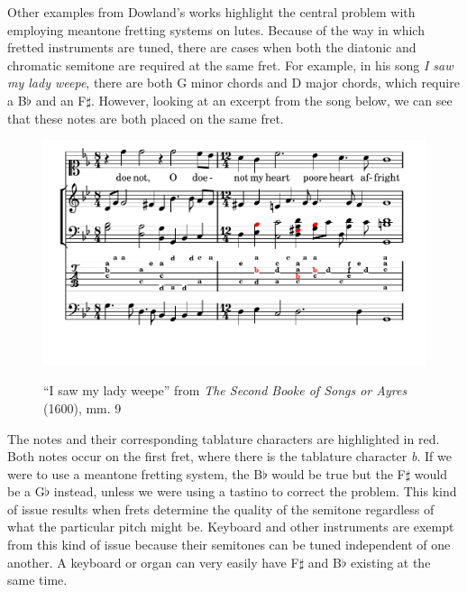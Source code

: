 Other examples from Dowland's works highlight the central problem with employing meantone fretting
systems on lutes.  Because of the way in which fretted instruments are tuned, there are cases when
both the diatonic and chromatic semitone are required at the same fret. For example, in his song
\textit{I saw my lady weepe}, there are both G minor chords and D major chords, which require a
B$\flat$ and an F$\sharp$. However, looking at an excerpt from the song below, we can see that
these notes are both placed on the same fret.
\begin{figure}[h]
\centering
\includegraphics{examples/saw.pdf}
\label{dowland-saw}
\caption{``I saw my lady weepe'' from \textit{The Second Booke of Songs or Ayres} (1600), mm. 9}
\end{figure}
The notes and their corresponding tablature characters are highlighted in red.  Both
notes occur on the first fret, where there is the tablature character \textit{b}.  If
we were to use a meantone fretting system, the B$\flat$ would be true but the F$\sharp$
would be a G$\flat$ instead, unless we were using a tastino to correct the problem.
This kind of issue results when frets determine the quality of the semitone regardless
of what the particular pitch might be.  Keyboard and other instruments are exempt from
this kind of issue because their semitones can be tuned independent of one another.  A
keyboard or organ can very easily have F$\sharp$ and B$\flat$ existing at the same time.

